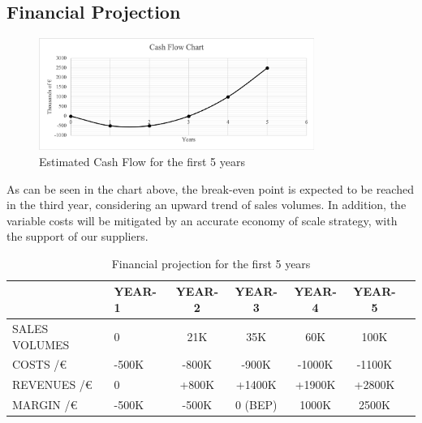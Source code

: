 \subsection{Financial Projection}
\begin{figure}[H]
\centering
\includegraphics[width=0.8\textwidth]{images/Cash_Flow_Chart.png}
\caption{Estimated Cash Flow for the first 5 years}
\end{figure}
As can be seen in the chart above, the break-even point is expected to be reached in the third year, considering an upward trend of sales volumes. In addition, the variable costs will be mitigated by an accurate economy of scale strategy, with the support of our suppliers.

\begin{table}[H]
\centering
\caption{Financial projection for the first 5 years}
\begin{tabular}{GGccccm{0.1\textwidth}}
\toprule
&YEAR-1 & YEAR-2 &	YEAR-3 & YEAR-4 & YEAR-5\\
\hline
SALES VOLUMES &	0 & 21K & 35K & 60K & 100K\\
\hline
COSTS /€ & -500K & -800K &	-900K &	-1000K & -1100K\\
\hline
REVENUES /€ &	0 &	+800K &	+1400K &	+1900K &	+2800K\\
\hline
MARGIN /€ & -500K & -500K &	0 (BEP) &	1000K &	2500K\\
\bottomrule
\end{tabular}
\end{table}